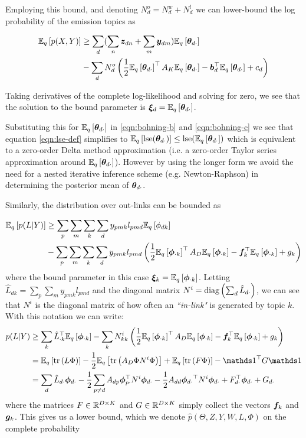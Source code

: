 Employing this bound, and denoting $N^o_d = N^w_d + N^l_d$ we can lower-bound the log probability of the emission topics as

\begin{equation}
\begin{aligned}
\ex{p(X,Y)}{q} & \geq \sum_d  (\sum_n \vv{z}_{dn} + \sum_m \vv{y}_{dm}) \ex{\thdo}{q} \\
   & - \sum_d N^o_d \left(\half \ex{\thdo}{q}\T A_K \ex{\thdo}{q} - \vv{b}_d\T\ex{\thdo}{q} + c_d\right)
\end{aligned}
\end{equation}

Taking derivatives of the complete log-likelihood and solving for zero, we see that the solution to the bound parameter is $\Ed = \ex{\thdo}{q}$. 

Substituting this for $\ex{\thdo}{q}$ in \eqref{eqn:bohning-b} and \eqref{eqn:bohning-c} we see that equation \eqref{eqn:lse-def} simplifies to $\ex{\lse(\thdo)}{q} \leq \lse(\ex{\thdo}{q})$ which is equivalent to a zero-order Delta method approximation (i.e. a zero-order Taylor series approximation around $\ex{\thdo}{q}$). However by using the longer form we avoid the need for a nested iterative inference scheme (e.g. Newton-Raphson) in determining the posterior mean of $\thdo$.

Similarly, the distribution over out-links can be bounded as

\begin{align}
\ex{p(L|Y)}{q} & \geq \sum_p \sum_m \sum_k \sum_d y_{pmk} l_{pmd} \ex{\phi_{dk}}{q} \\
 & - \sum_p \sum_m \sum_k \sum_d y_{pmk} l_{pmd} \left(\half \ex{\phok}{q}\T A_D \ex{\phok}{q} - \vv{f}_k\T \ex{\phok}{q} + g_k\right)
\end{align}
where the bound parameter in this case $\vv{\xi}_k = \ex{\phok}{q}$. Letting $\hat{L}_{dk} = \sum_p \sum_m y_{pmk} l_{pmd}$ and the diagonal matrix $N^i = \diag{\sum_d \hat{L}_{d\cdot}}$, we can see that $N^i$ is the diagonal matrix of how often an \emph{``in-link"} is generated by topic $k$. With this notation we can write:
\begin{align}
p(L|Y) & \geq \sum_k \hat{L}_{\cdot k}\T \ex{\phok}{q} - \sum_k N^i_{kk} \left(\half \ex{\phok}{q}\T A_D \ex{\phok}{q} - \vv{f}_k\T \ex{\phok}{q} + g_k\right) \\
& = \ex{\Tr{L \Phi}}{q} - \half \ex{\Tr{A_D \Phi N^i \Phi}}{q} + \ex{\Tr{F \Phi}}{q} - \one\T G \one \\
& = \sum_d \hat{L}_{d\cdot} \phdo - \half \sum_{p \neq d} A_{dp} \vv{\phi}_{p\cdot}\T N^i \phdo -\half A_{dd} \phdo\T N^i \phdo + F_{d\cdot}\T\phdo + G_{d\cdot}
\end{align}
where the matrices $F \in \MReal{D}{K}$ and $G \in \MReal{D}{K}$ simply collect the vectors $\vv{f}_k$ and $\vv{g}_k$. This gives us a lower bound, which we denote $\hat{p}(\Theta, Z, Y, W, L, \Phi)$  on the complete probability


